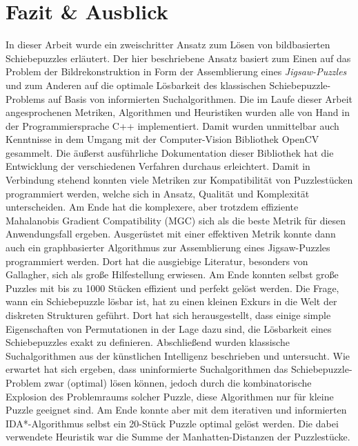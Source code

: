 \documentclass{whswinvcbook}
\begin{document}
\chapter{Fazit \& Ausblick}
In dieser Arbeit wurde ein zweischritter Ansatz zum Lösen von bildbasierten Schiebepuzzles erläutert. Der hier beschriebene Ansatz basiert zum Einen auf das Problem der Bildrekonstruktion in Form der Assemblierung eines \textit{Jigsaw-Puzzles} und zum Anderen auf die optimale Lösbarkeit des klassischen Schiebepuzzle-Problems auf Basis von informierten Suchalgorithmen. Die im Laufe dieser Arbeit angesprochenen Metriken, Algorithmen und Heuristiken wurden alle von Hand in der Programmiersprache C++ implementiert. Damit wurden unmittelbar auch Kenntnisse in dem Umgang mit der Computer-Vision Bibliothek OpenCV gesammelt. Die äußerst ausführliche Dokumentation dieser Bibliothek hat die Entwicklung der verschiedenen Verfahren durchaus erleichtert. Damit in Verbindung stehend konnten viele Metriken zur Kompatibilität von Puzzlestücken programmiert werden, welche sich in Ansatz, Qualität und Komplexität unterscheiden. Am Ende hat die komplexere, aber trotzdem effiziente Mahalanobis Gradient Compatibility (MGC) sich als die beste Metrik für diesen Anwendungsfall ergeben. Ausgerüstet mit einer effektiven Metrik konnte dann auch ein graphbasierter Algorithmus zur Assemblierung eines Jigsaw-Puzzles programmiert werden. Dort hat die ausgiebige Literatur, besonders von Gallagher\cite{gallagher}, sich als große Hilfestellung erwiesen. Am Ende konnten selbst große Puzzles mit bis zu 1000 Stücken effizient und perfekt gelöst werden. Die Frage, wann ein Schiebepuzzle lösbar ist, hat zu einen kleinen Exkurs in die Welt der diskreten Strukturen geführt. Dort hat sich herausgestellt, dass einige simple Eigenschaften von Permutationen in der Lage dazu sind, die Lösbarkeit eines Schiebepuzzles exakt zu definieren. Abschließend wurden klassische Suchalgorithmen aus der künstlichen Intelligenz beschrieben und untersucht. Wie erwartet hat sich ergeben, dass uninformierte Suchalgorithmen das Schiebepuzzle-Problem zwar (optimal) lösen können, jedoch durch die kombinatorische Explosion des Problemraums solcher Puzzle, diese Algorithmen nur für kleine Puzzle geeignet sind. Am Ende konnte aber mit dem iterativen und informierten IDA*-Algorithmus selbst ein 20-Stück Puzzle optimal gelöst werden. Die dabei verwendete Heuristik war die Summe der Manhatten-Distanzen der Puzzlestücke.
\end{document}
